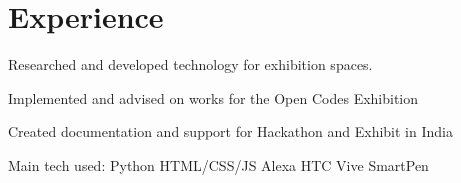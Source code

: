 \documentclass[a4paper]{deedy-resume-twopage} %
\begin{document}

\lastupdated %



\begin{minipage}[t]{0.66\textwidth} %



  \section{Experience}


  \vspace{\topsep} %
  \begin{tightitemize}
  \item Researched and developed technology for exhibition spaces.
  \item Implemented and advised on works for the Open Codes Exhibition
  \item Created documentation and support for Hackathon and Exhibit in India
  \end{tightitemize}
  Main tech used: \textbullet{} Python \textbullet{} HTML/CSS/JS \textbullet{} Alexa \textbullet{} HTC Vive \textbullet{} SmartPen \textbullet{}

  \sectionspace %




\end{minipage}
\end{document}

